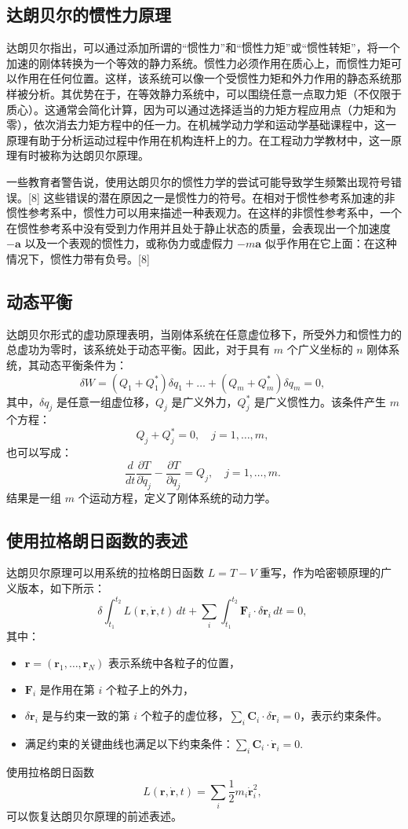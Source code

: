 \subsection{达朗贝尔的惯性力原理}
达朗贝尔指出，可以通过添加所谓的“惯性力”和“惯性力矩”或“惯性转矩”，将一个加速的刚体转换为一个等效的静力系统。惯性力必须作用在质心上，而惯性力矩可以作用在任何位置。这样，该系统可以像一个受惯性力矩和外力作用的静态系统那样被分析。其优势在于，在等效静力系统中，可以围绕任意一点取力矩（不仅限于质心）。这通常会简化计算，因为可以通过选择适当的力矩方程应用点（力矩和为零），依次消去力矩方程中的任一力。在机械学动力学和运动学基础课程中，这一原理有助于分析运动过程中作用在机构连杆上的力。在工程动力学教材中，这一原理有时被称为达朗贝尔原理。

一些教育者警告说，使用达朗贝尔的惯性力学的尝试可能导致学生频繁出现符号错误。[8] 这些错误的潜在原因之一是惯性力的符号。在相对于惯性参考系加速的非惯性参考系中，惯性力可以用来描述一种表观力。在这样的非惯性参考系中，一个在惯性参考系中没有受到力作用并且处于静止状态的质量，会表现出一个加速度 \(-\mathbf{a}\) 以及一个表观的惯性力，或称伪力或虚假力 \(-m\mathbf{a}\) 似乎作用在它上面：在这种情况下，惯性力带有负号。[8]
\subsection{动态平衡}
达朗贝尔形式的虚功原理表明，当刚体系统在任意虚位移下，所受外力和惯性力的总虚功为零时，该系统处于动态平衡。因此，对于具有 \( m \) 个广义坐标的 \( n \) 刚体系统，其动态平衡条件为：
\[
\delta W = \left(Q_1 + Q_1^{*}\right) \delta q_1 + \dots + \left(Q_m + Q_m^{*}\right) \delta q_m = 0,~
\]
其中，\( \delta q_j \) 是任意一组虚位移，\( Q_j \) 是广义外力，\( Q_j^{*} \) 是广义惯性力。该条件产生 \( m \) 个方程：
\[
Q_j + Q_j^{*} = 0, \quad j = 1, \dots, m,~
\]
也可以写成：
\[
\frac{d}{dt} \frac{\partial T}{\partial \dot{q}_j} - \frac{\partial T}{\partial q_j} = Q_j, \quad j = 1, \dots, m.~
\]
结果是一组 \( m \) 个运动方程，定义了刚体系统的动力学。
\subsection{使用拉格朗日函数的表述}
达朗贝尔原理可以用系统的拉格朗日函数 \( L = T - V \) 重写，作为哈密顿原理的广义版本，如下所示：
\[
\delta \int_{t_1}^{t_2} L(\mathbf{r}, \dot{\mathbf{r}}, t) \, dt + \sum_i \int_{t_1}^{t_2} \mathbf{F}_i \cdot \delta \mathbf{r}_i \, dt = 0,~
\]
其中：
\begin{itemize}
\item \( \mathbf{r} = (\mathbf{r}_1, \dots, \mathbf{r}_N) \) 表示系统中各粒子的位置，
\item \( \mathbf{F}_i \) 是作用在第 \( i \) 个粒子上的外力，
\item \( \delta \mathbf{r}_i \) 是与约束一致的第 \( i \) 个粒子的虚位移，\( \sum_i \mathbf{C}_i \cdot \delta \mathbf{r}_i = 0 \)，表示约束条件。
\item 满足约束的关键曲线也满足以下约束条件：\(\sum_i \mathbf{C}_i \cdot \dot{\mathbf{r}}_i = 0.\)
\end{itemize}
使用拉格朗日函数
\[
L(\mathbf{r}, \dot{\mathbf{r}}, t) = \sum_i \frac{1}{2} m_i \dot{\mathbf{r}}_i^2,~
\]
可以恢复达朗贝尔原理的前述表述。